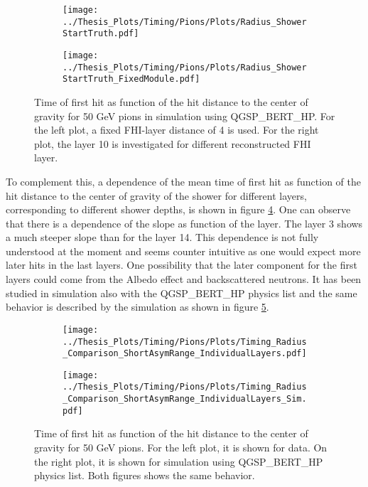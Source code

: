 \begin{figure}[htbp!]
	\begin{subfigure}[t]{0.5\textwidth}
		\centering
		\texttt{[image: ../Thesis\_Plots/Timing/Pions/Plots/Radius\_ShowerStartTruth.pdf]}
		\caption{}\label{fig:Radius_FHISim1}
	\end{subfigure}
	\hfill
	\begin{subfigure}[t]{0.5\textwidth}
		\centering
		\texttt{[image: ../Thesis\_Plots/Timing/Pions/Plots/Radius\_ShowerStartTruth\_FixedModule.pdf]}
		\caption{}\label{fig:Radius_FHI_FixedSim}
	\end{subfigure}
	\caption{Time of first hit as function of the hit distance to the center of gravity for 50 GeV pions in \mokka simulation using QGSP\_BERT\_HP. For the left plot, a fixed FHI-layer distance of 4 is used. For the right plot, the layer 10 is investigated for different reconstructed FHI layer.}
	\label{fig:Radius_FHISim}
\end{figure}

To complement this, a dependence of the mean time of first hit as function of the hit distance to the center of gravity of the shower for different layers, corresponding to different shower depths, is shown in figure \ref{fig:Radius_Indivi}.
One can observe that there is a dependence of the slope as function of the layer. The layer 3 shows a much steeper slope than for the layer 14. This dependence is not fully understood at the moment and seems counter intuitive as one would expect more later hits in the last layers. One possibility that the later component for the first layers could come from the Albedo effect \cite{ELLSWORTH1982167} and backscattered neutrons. It has been studied in simulation also with the QGSP\_BERT\_HP physics list and the same behavior is described by the simulation as shown in figure \ref{fig:Radius_Indivi_Sim}.

\begin{figure}[htbp!]
	\begin{subfigure}[t]{0.5\textwidth}
		\centering
		\texttt{[image: ../Thesis\_Plots/Timing/Pions/Plots/Timing\_Radius\_Comparison\_ShortAsymRange\_IndividualLayers.pdf]}
		\caption{}\label{fig:Radius_Indivi}
	\end{subfigure}
	\hfill
	\begin{subfigure}[t]{0.5\textwidth}
		\centering
		\texttt{[image: ../Thesis\_Plots/Timing/Pions/Plots/Timing\_Radius\_Comparison\_ShortAsymRange\_IndividualLayers\_Sim.pdf]}
		\caption{}\label{fig:Radius_Indivi_Sim}
	\end{subfigure}
	\caption{Time of first hit as function of the hit distance to the center of gravity for 50 GeV pions. For the left plot, it is shown for data. On the right plot, it is shown for \mokka simulation using QGSP\_BERT\_HP physics list. Both figures shows the same behavior.}
	\label{fig:Radius_IndiviAll}
\end{figure}


